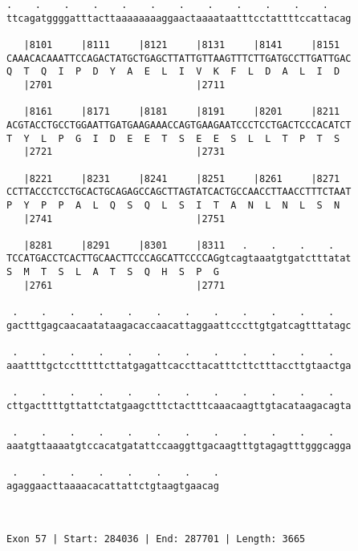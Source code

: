 \documentclass{article}
\begin{document}
\begin{Verbatim}
.    .    .    .    .    .    .    .    .    .    .    .    
ttcagatggggatttacttaaaaaaaaggaactaaaataatttcctattttccattacag
                                                            
   |8101     |8111     |8121     |8131     |8141     |8151  
CAAACACAAATTCCAGACTATGCTGAGCTTATTGTTAAGTTTCTTGATGCCTTGATTGAC
Q  T  Q  I  P  D  Y  A  E  L  I  V  K  F  L  D  A  L  I  D  
   |2701                         |2711                      
  
   |8161     |8171     |8181     |8191     |8201     |8211  
ACGTACCTGCCTGGAATTGATGAAGAAACCAGTGAAGAATCCCTCCTGACTCCCACATCT
T  Y  L  P  G  I  D  E  E  T  S  E  E  S  L  L  T  P  T  S  
   |2721                         |2731                      
  
   |8221     |8231     |8241     |8251     |8261     |8271  
CCTTACCCTCCTGCACTGCAGAGCCAGCTTAGTATCACTGCCAACCTTAACCTTTCTAAT
P  Y  P  P  A  L  Q  S  Q  L  S  I  T  A  N  L  N  L  S  N  
   |2741                         |2751                      
  
   |8281     |8291     |8301     |8311   .    .    .    .   
TCCATGACCTCACTTGCAACTTCCCAGCATTCCCCAGgtcagtaaatgtgatctttatat
S  M  T  S  L  A  T  S  Q  H  S  P  G                       
   |2761                         |2771                      
  
 .    .    .    .    .    .    .    .    .    .    .    .   
gactttgagcaacaatataagacaccaacattaggaattcccttgtgatcagtttatagc
                                                            
 .    .    .    .    .    .    .    .    .    .    .    .   
aaattttgctcctttttcttatgagattcaccttacatttcttctttaccttgtaactga
                                                            
 .    .    .    .    .    .    .    .    .    .    .    .   
cttgacttttgttattctatgaagctttctactttcaaacaagttgtacataagacagta
                                                            
 .    .    .    .    .    .    .    .    .    .    .    .   
aaatgttaaaatgtccacatgatattccaaggttgacaagtttgtagagtttgggcagga
                                                            
 .    .    .    .    .    .    .    .
agaggaacttaaaacacattattctgtaagtgaacag
                                     
                                     
 
Exon 57 | Start: 284036 | End: 287701 | Length: 3665




\end{Verbatim}
\end{document}
